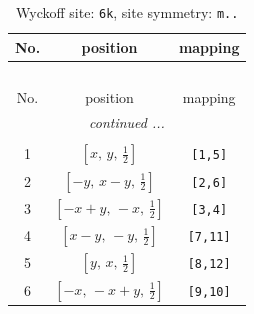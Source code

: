 \documentclass[fleqn,8pt]{jsarticle}
\begin{document}
\renewcommand{\arraystretch}{1.2}
\begin{longtable}{ccc}
\caption{Wyckoff site: {\tt 6k}, site symmetry: {\tt m..}}
 \\
 \hline \hline
No. & position & mapping \\ \hline \endfirsthead

\multicolumn{2}{l}{\tablename\ \thetable{}} \\
 \hline \hline
No. & position & mapping \\ \hline \endhead

 \hline \hline
\multicolumn{2}{r}{\footnotesize\it continued ...} \\ \endfoot

 \hline \hline
\multicolumn{2}{r}{} \\ \endlastfoot

1 & $\left[ x,\, y,\, \frac{1}{2} \right]$ & {\tt [1,5]} \\ \hline
2 & $\left[ - y,\, x - y,\, \frac{1}{2} \right]$ & {\tt [2,6]} \\ \hline
3 & $\left[ - x + y,\, - x,\, \frac{1}{2} \right]$ & {\tt [3,4]} \\ \hline
4 & $\left[ x - y,\, - y,\, \frac{1}{2} \right]$ & {\tt [7,11]} \\ \hline
5 & $\left[ y,\, x,\, \frac{1}{2} \right]$ & {\tt [8,12]} \\ \hline
6 & $\left[ - x,\, - x + y,\, \frac{1}{2} \right]$ & {\tt [9,10]} \\
\end{longtable}
\renewcommand{\arraystretch}{1.2}
\end{document}
